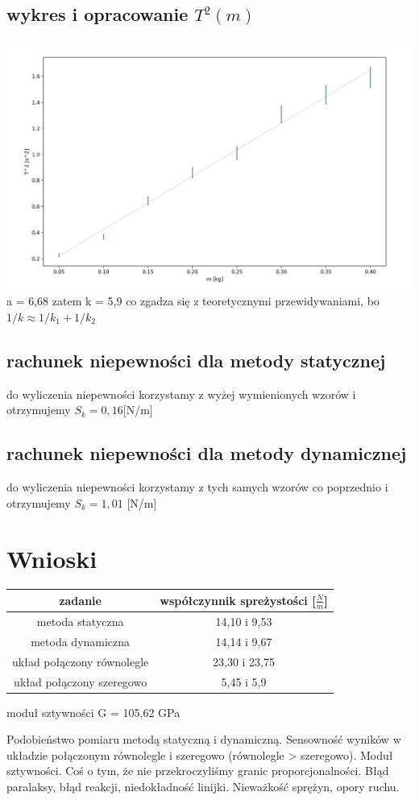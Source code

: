 \documentclass{article}
\begin{document}
\subsection{wykres i opracowanie $T^2(m)$}
\includegraphics[width=15cm]{m7_2_2}
a = 6,68 zatem k = 5,9 co zgadza się z teoretycznymi przewidywaniami, bo $1/k \approx 1/k_1 + 1/k_2$

\subsection{rachunek niepewności dla metody statycznej}
do wyliczenia niepewności korzystamy z wyżej wymienionych wzorów i otrzymujemy 
$S_k = 0,16 $[N/m]

\subsection{rachunek niepewności dla metody dynamicznej}
do wyliczenia niepewności korzystamy z tych samych wzorów co poprzednio i otrzymujemy
$S_k = 1, 01$ [N/m]


\section{Wnioski}

\begin{center}
\begin{tabular}{ c | c }
zadanie & współczynnik spreżystości [$\frac{N}{m}$]  \\


\hline
 metoda statyczna  & 14,10 i 9,53\\  
 metoda dynamiczna & 14,14 i 9,67 \\
 układ połączony równolegle& 23,30 i 23,75 \\
 układ połączony szeregowo & 5,45 i 5,9 
\end{tabular}
\end{center}

\begin{center}
	moduł sztywności G = 105,62 GPa
\end{center}

Podobieństwo pomiaru metodą statyczną i dynamiczną.
Sensowność wyników w układzie połączonym równolegle i szeregowo (równolegle > szeregowo).
Moduł sztywności. Coś o tym, że nie przekroczyliśmy granic proporcjonalności.
Błąd paralaksy, błąd reakcji, niedokładność linijki. Nieważkość sprężyn, opory ruchu.
\end{document}
